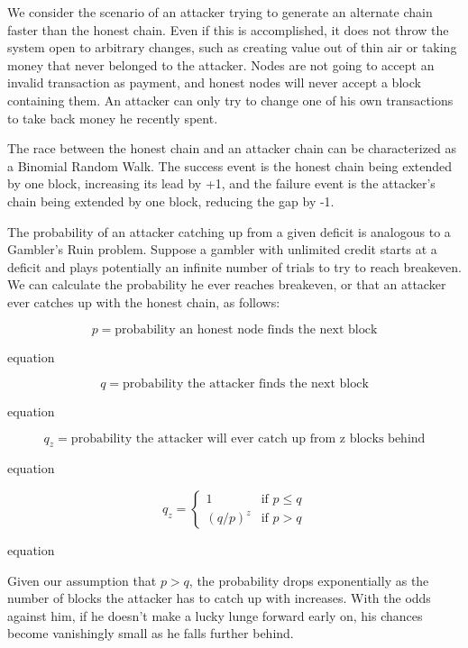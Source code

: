 We consider the scenario of an attacker trying to generate an alternate chain faster than the honest chain. Even if this is accomplished, it does not throw the system open to arbitrary changes, such as creating value out of thin air or taking money that never belonged to the attacker. Nodes are not going to accept an invalid transaction as payment, and honest nodes will never accept a block containing them. An attacker can only try to change one of his own transactions to take back money he recently spent.

The race between the honest chain and an attacker chain can be characterized as a Binomial Random Walk. The success event is the honest chain being extended by one block, increasing its lead by +1, and the failure event is the attacker's chain being extended by one block, reducing the gap by -1.

The probability of an attacker catching up from a given deficit is analogous to a Gambler's Ruin problem. Suppose a gambler with unlimited credit starts at a deficit and plays potentially an infinite number of trials to try to reach breakeven. We can calculate the probability he ever reaches breakeven, or that an attacker ever catches up with the honest chain, as follows:

\begin{equation}
p = \text{probability an honest node finds the next block}
\end{equation}

equation

\begin{equation}
q = \text{probability the attacker finds the next block}
\end{equation}

equation

\begin{equation}
q_z = \text{probability the attacker will ever catch up from z blocks behind}
\end{equation}

equation

\begin{equation}
q_z = \begin{cases}
1 & \text{if } p \leq q \\
(q/p)^z & \text{if } p > q
\end{cases}
\end{equation}

equation

Given our assumption that $p > q$, the probability drops exponentially as the number of blocks the attacker has to catch up with increases. With the odds against him, if he doesn't make a lucky lunge forward early on, his chances become vanishingly small as he falls further behind.

